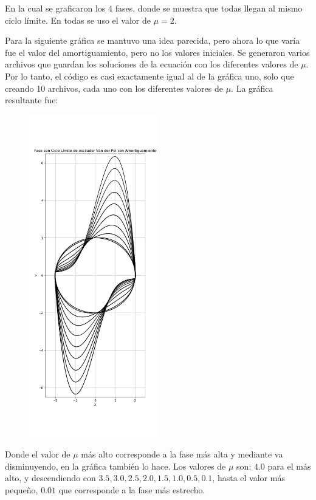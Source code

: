\documentclass[a4paper]{article}
\begin{document}
En la cual se graficaron los 4 fases, donde se muestra que todas llegan al mismo ciclo límite. En todas se uso el valor de $\mu = 2$.
\bigskip

Para la siguiente gráfica se mantuvo una idea parecida, pero ahora lo que varía fue el valor del amortiguamiento, pero no los valores iniciales. Se generaron varios archivos que guardan los soluciones de la ecuación con los diferentes valores de $\mu$. Por lo tanto, el código es casi exactamente igual al de la gráfica uno, solo que creando 10 archivos, cada uno con los diferentes valores de $\mu$. La gráfica resultante fue:

\pagebreak

\begin{figure}[h!]
 \centering
  \includegraphics[width=0.5\textwidth]{VP_Miu.png}
\end{figure}

Donde el valor de $\mu$ más alto corresponde a la fase más alta y mediante va disminuyendo, en la gráfica también lo hace. Los valores de $\mu$ son: $4.0$ para el más alto, y descendiendo con $3.5, 3.0, 2.5, 2.0, 1.5, 1.0, 0.5, 0.1$, hasta el valor más pequeño, $0.01$ que corresponde a la fase más estrecho. 
\end{document}
